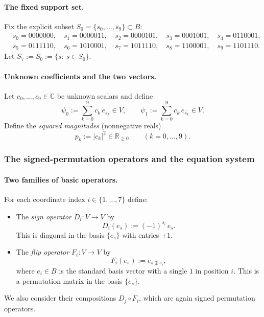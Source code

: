 \documentclass[11pt]{article}
\begin{document}
\paragraph{The fixed support set.}
Fix the explicit subset $S_0=\{s_0,\dots,s_9\}\subset B$:
\[
\begin{aligned}
&s_0=0000000,\quad s_1=0000011,\quad s_2=0000101,\quad s_3=0001001,\quad s_4=0110001,\\
&s_5=0111110,\quad s_6=1010001,\quad s_7=1011110,\quad s_8=1100001,\quad s_9=1101110.
\end{aligned}
\]
Let $S_7:=\overline{S_0}:=\{\bar s:\ s\in S_0\}$.

\paragraph{Unknown coefficients and the two vectors.}
Let $c_0,\dots,c_9\in\mathbb C$ be unknown scalars and define
\begin{equation}
\psi_0 := \sum_{k=0}^9 c_k\, e_{s_k}\in V,
\qquad
\psi_1 := \sum_{k=0}^9 c_k\, e_{\overline{s_k}}\in V.
\label{eq:pure-def-psi01}
\end{equation}
Define the \emph{squared magnitudes} (nonnegative reals)
\[
p_k:=|c_k|^2\in\mathbb R_{\ge 0}\qquad (k=0,\dots,9).
\]

\subsubsection*{The signed-permutation operators and the equation system}

\paragraph{Two families of basic operators.}
For each coordinate index $i\in\{1,\dots,7\}$ define:
\begin{itemize}
\item The \emph{sign operator} $D_i:V\to V$ by
\[
D_i(e_s):=(-1)^{s_i}\,e_s.
\]
This is diagonal in the basis $\{e_s\}$ with entries $\pm 1$.
\item The \emph{flip operator} $F_i:V\to V$ by
\[
F_i(e_s):=e_{s\oplus e_i},
\]
where $e_i\in B$ is the standard basis vector with a single $1$ in position $i$.
This is a permutation matrix in the basis $\{e_s\}$.
\end{itemize}
We also consider their compositions $D_j\circ F_i$, which are again signed permutation operators.
\end{document}
